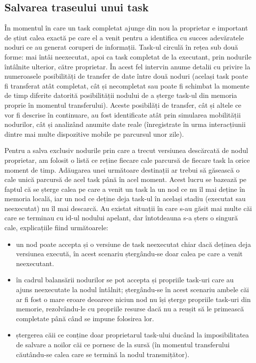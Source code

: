 \documentclass[12pt,a4paper]{report}
\begin{document}
\subsection{Salvarea traseului unui task}

În momentul în care un task completat ajunge din nou la proprietar e important de știut calea exactă pe care el a venit pentru a identifica cu succes adevăratele noduri ce au generat coruperi de informații. Task-ul circulă în rețea sub două forme: mai întâi neexecutat, apoi ca task completat de la executant, prin nodurile întâlnite ulterior, către proprietar. În acest fel intervin anume detalii cu privire la numeroasele posibilități de transfer de date între două noduri (același task poate fi transferat atât completat, cât și necompletat sau poate fi schimbat la momente de timp diferite datorită posibilității nodului de a șterge task-ul din memoria proprie în momentul transferului). Aceste posibilăți de transfer, cât și altele ce vor fi descrise în continuare, au fost identificate atât prin simularea mobilității nodurilor, cât și analizând anumite date reale (înregistrate în urma interacțiunii dintre mai multe dispozitive mobile pe parcursul unor zile).

Pentru a salva exclusiv nodurile prin care a trecut versiunea descărcată de nodul proprietar, am folosit o listă ce reține fiecare cale parcursă de fiecare task la orice moment de timp. Adăugarea unei următoare destinații ar trebui să găsească o cale unică parcursă de acel task până în acel moment. Acest lucru se bazează pe faptul că se șterge calea pe care a venit un task la un nod ce nu îl mai deține în memoria locală, iar un nod ce deține deja task-ul în același stadiu (executat sau neexecutat) nu îl mai descarcă. Au existat situații în care s-au găsit mai multe căi care se terminau cu id-ul nodului apelant, dar întotdeauna s-a șters o singură cale, explicațiile fiind următoarele:
\begin{itemize}
	\item un nod poate accepta și o versiune de task neexecutat chiar dacă deținea deja versiunea execută, în acest scenariu ștergându-se doar calea pe care a venit neexecutant.
	\item în cadrul balansării nodurilor se pot accepta și propriile task-uri care au ajuns neexecutate la nodul întâlnit; ștergându-se în acest scenariu ambele căi ar fi fost o mare eroare deoarece niciun nod nu își șterge propriile task-uri din memorie, rezolvându-le cu propriile resurse dacă nu a reușit să le primească completate până când se impune folosirea lor.
	\item ștergerea căii ce conține doar proprietarul task-ului ducând la imposibilitatea de salvare a noilor căi ce pornesc de la sursă (în momentul transferului căutându-se calea care se termină la nodul transmițător).
\end{itemize}
\end{document}
